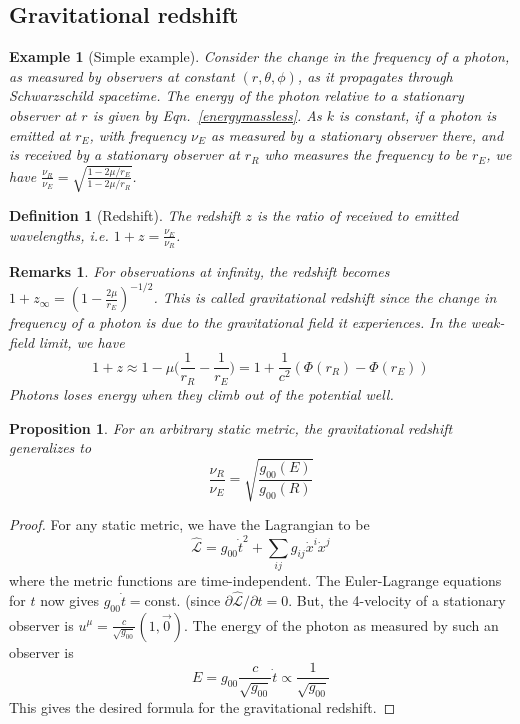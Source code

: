 \documentclass[a4paper]{article}
\newtheorem{eg}{Example}[section]
\newtheorem{remarks}{Remarks}[section]
\theoremstyle{new}
\newtheorem{defi}{Definition}[section]
\newtheorem{prop}{Proposition}[section]
\begin{document}
\subsection{Gravitational redshift}
\begin{eg}[Simple example]
Consider the change in the frequency of a photon, as measured by observers at constant $(r,\theta,\phi)$, as it propagates through Schwarzschild spacetime. The energy of the photon relative to a stationary observer at $r$ is given by Eqn.~\ref{energymassless}. As $k$ is constant, if a photon is emitted at $r_E$, with frequency $\nu_E$ as measured by a stationary observer there, and is received by a stationary observer at $r_R$ who measures the frequency to be $r_E$, we have $\frac{\nu_R}{\nu_E}=\sqrt{\frac{1-2\mu/r_E}{1-2\mu/r_R}}$. \end{eg}
\begin{defi}[Redshift]
The redshift $z$ is the ratio of received to emitted wavelengths, i.e.
$1+z=\frac{\nu_E}{\nu_R}$.
\end{defi}
\begin{remarks}
For observations at infinity, the redshift becomes  $1+z_\infty=(1-\frac{2\mu}{r_E})^{-1/2}$. This is called gravitational redshift since the change in frequency of a photon is due to the gravitational field it experiences. In the weak-field limit, we have
$$1+z\approx1-\mu\bigg(\frac{1}{r_R}-\frac{1}{r_E}\bigg)=1+\frac{1}{c^2}(\Phi(r_R)-\Phi(r_E))$$
Photons loses energy when they climb out of the potential well.
\end{remarks}
\begin{prop}
For an arbitrary static metric, the gravitational redshift generalizes to
\begin{equation}
\frac{\nu_R}{\nu_E}=\sqrt{\frac{g_{00}(E)}{g_{00}(R)}}\label{gravitationalredshift}
\end{equation}
\end{prop}
\begin{proof}
For any static metric, we have the Lagrangian to be
$$\hat{\mathcal{L}}=g_{00}\dot{t}^2+\sum_{ij}g_{ij}\dot{x}^i\dot{x}^j$$
where the metric functions are time-independent. The Euler-Lagrange equations for $t$ now gives $g_{00}\dot{t}=$const. (since $\partial\hat{\mathcal{L}}/\partial t=0$. But, the 4-velocity of a stationary observer is $u^\mu=\frac{c}{\sqrt{g_00}}(1,\vec{0})$. The energy of the photon as measured by such an observer is
$$E=g_{00}\frac{c}{\sqrt{g_{00}}}\dot{t}\propto\frac{1}{\sqrt{g_{00}}}$$
This gives the desired formula for the gravitational redshift.
\end{proof}
\newpage
\end{document}
